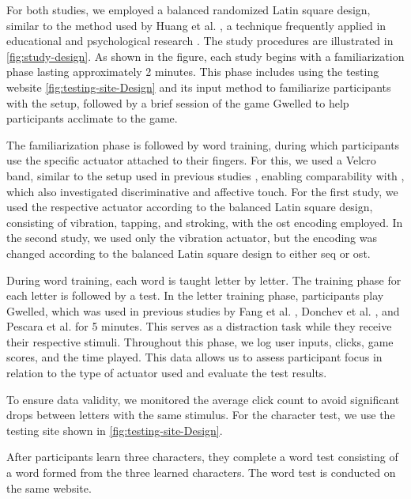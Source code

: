 For both studies, we employed a balanced randomized Latin square design, similar to the method used by Huang et al. \cite{Huang2010}, a technique frequently applied in educational and psychological research \cite{Richardson2018}. The study procedures are illustrated in \autoref{fig:study-design}. As shown in the figure, each study begins with a familiarization phase lasting approximately 2 minutes. This phase includes using the testing website \autoref{fig:testing-site-Design} and its input method to familiarize participants with the setup, followed by a brief session of the game Gwelled to help participants acclimate to the game.

The familiarization phase is followed by word training, during which participants use the specific actuator attached to their fingers. For this, we used a Velcro band, similar to the setup used in previous studies \cite{Vaio6810, Fang2023}, enabling comparability with \cite{Fang2023}, which also investigated discriminative and affective touch. For the first study, we used the respective actuator according to the balanced Latin square design, consisting of vibration, tapping, and stroking, with the \gls{ost} encoding employed. In the second study, we used only the vibration actuator, but the encoding was changed according to the balanced Latin square design to either \gls{seq} or \gls{ost}.

During word training, each word is taught letter by letter. The training phase for each letter is followed by a test. In the letter training phase, participants play Gwelled, which was used in previous studies by Fang et al. \cite{Fang2023}, Donchev et al. \cite{Donchev2021}, and Pescara et al. \cite{Pescara2019} for 5 minutes. This serves as a distraction task while they receive their respective stimuli. Throughout this phase, we log user inputs, clicks, game scores, and the time played. This data allows us to assess participant focus in relation to the type of actuator used and evaluate the test results.

To ensure data validity, we monitored the average click count to avoid significant drops between letters with the same stimulus. For the character test, we use the testing site shown in \autoref{fig:testing-site-Design}.

After participants learn three characters, they complete a word test consisting of a word formed from the three learned characters. The word test is conducted on the same website.

